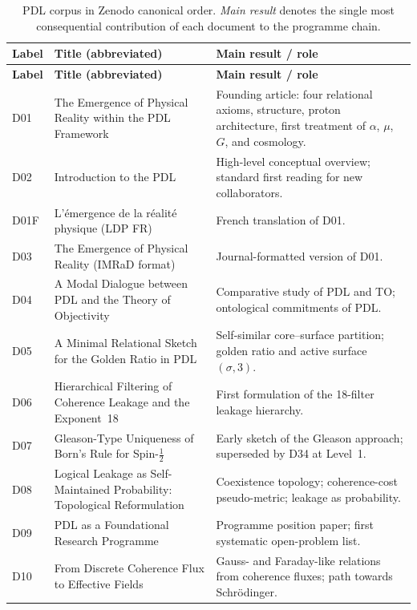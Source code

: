 \documentclass[11pt,a4paper]{article}
\theoremstyle{plain}
\theoremstyle{definition}
\theoremstyle{remark}
\begin{document}
\begin{longtable}{L{1.3cm}L{3.8cm}L{8.0cm}}
\caption{PDL corpus in Zenodo canonical order. \emph{Main result} denotes the single most consequential contribution of each document to the programme chain.}
\label{tab:documents}\\
\toprule
\textbf{Label} & \textbf{Title (abbreviated)} & \textbf{Main result / role}\\
\midrule
\endfirsthead
\toprule
\textbf{Label} & \textbf{Title (abbreviated)} & \textbf{Main result / role}\\
\midrule
\endhead
\bottomrule
\endfoot
D01 & The Emergence of Physical Reality within the PDL Framework~\cite{D01} & Founding article: four relational axioms, structure, proton architecture, first treatment of $\alpha$, $\mu$, $G$, and cosmology.\\[0.3em]
D02 & Introduction to the PDL~\cite{D02} & High-level conceptual overview; standard first reading for new collaborators.\\[0.3em]
D01F & L'\'emergence de la r\'ealit\'e physique (LDP FR)~\cite{D01F} & French translation of D01.\\[0.3em]
D03 & The Emergence of Physical Reality (IMRaD format)~\cite{D03} & Journal-formatted version of D01.\\[0.3em]
D04 & A Modal Dialogue between PDL and the Theory of Objectivity~\cite{D04} & Comparative study of PDL and TO; ontological commitments of PDL.\\[0.3em]
D05 & A Minimal Relational Sketch for the Golden Ratio in PDL~\cite{D05} & Self-similar core--surface partition; golden ratio and active surface $(\sigma,3)$.\\[0.3em]
D06 & Hierarchical Filtering of Coherence Leakage and the Exponent~18~\cite{D06} & First formulation of the 18-filter leakage hierarchy.\\[0.3em]
D07 & Gleason-Type Uniqueness of Born's Rule for Spin-$\tfrac{1}{2}$~\cite{D07} & Early sketch of the Gleason approach; superseded by D34 at Level~1.\\[0.3em]
D08 & Logical Leakage as Self-Maintained Probability: Topological Reformulation~\cite{D08} & Coexistence topology; coherence-cost pseudo-metric; leakage as probability.\\[0.3em]
D09 & PDL as a Foundational Research Programme~\cite{D09} & Programme position paper; first systematic open-problem list.\\[0.3em]
D10 & From Discrete Coherence Flux to Effective Fields~\cite{D10} & Gauss- and Faraday-like relations from coherence fluxes; path towards Schr\"odinger.\\[0.3em]

\end{longtable}
\end{document}
